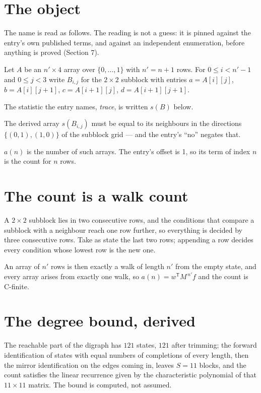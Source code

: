 \documentclass[11pt]{article}
\theoremstyle{definition}
\begin{document}
\section{The object}

The name is read as follows. The reading is not a guess: it is pinned against the entry's own published terms, and against an independent enumeration, before anything is proved (Section 7).

Let $A$ be an $n' \times 4$ array over $\{0,\dots,1\}$ with $n' = n + 1$ rows. For $0 \le i < n'-1$ and $0 \le j < 3$ write $B_{i,j}$ for the $2\times2$ subblock with entries $a = A[i][j]$, $b = A[i][j{+}1]$, $c = A[i{+}1][j]$, $d = A[i{+}1][j{+}1]$.

The statistic the entry names, {\itshape trace}, is written $s(B)$ below.

The derived array $s(B_{i,j})$ must be equal to its neighbours in the directions $\{(0,1), (1,0)\}$ of the subblock grid --- and the entry's ``no'' negates that.

$a(n)$ is the number of such arrays. The entry's offset is 1, so its term of index $n$ is the count for $n$ rows.

\section{The count is a walk count}

A $2\times2$ subblock lies in two consecutive rows, and the conditions that compare a subblock with a neighbour reach one row further, so everything is decided by three consecutive rows. Take as state the last two rows; appending a row decides every condition whose lowest row is the new one.

An array of $n'$ rows is then exactly a walk of length $n'$ from the empty state, and every array arises from exactly one walk, so $a(n) = w^{\mathsf T}M^{\,n'}f$ and the count is C-finite.

\section{The degree bound, derived}

The reachable part of the digraph has $121$ states, $121$ after trimming; the forward identification of states with equal numbers of completions of every length, then the mirror identification on the edges coming in, leaves $S = 11$ blocks, and the count satisfies the linear recurrence given by the characteristic polynomial of that $11\times11$ matrix. The bound is computed, not assumed.
\end{document}
